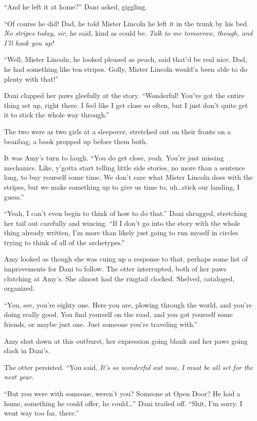 ``And he left it at home?'' Dani asked, giggling.

``Of course he did! Dad, he told Mister Lincoln he left it in the trunk by his bed. \emph{No stripes today, sir,} he said, kind as could be. \emph{Talk to me tomorrow, though, and I'll hook you up!}

``Well, Mister Lincoln, he looked pleased as peach, said that'd be real nice. Dad, he had something like ten stripes. Golly, Mister Lincoln would'a been able to do plenty with that!''

Dani clapped her paws gleefully at the story. ``Wonderful! You've got the entire thing set up, right there. I feel like I get close so often, but I just don't quite get it to stick the whole way through.''

The two were as two girls at a sleepover, stretched out on their fronts on a beanbag, a book propped up before them both.

It was Amy's turn to laugh. ``You do get close, yeah. You're just missing mechanics. Like, y'gotta start telling little side stories, no more than a sentence long, to buy yourself some time. We don't care what Mister Lincoln does with the stripes, but we make something up to give us time to, uh\ldots{}stick our landing, I guess.''

``Yeah, I can't even begin to think of how to do that.'' Dani shrugged, stretching her tail out carefully and wincing. ``If I don't go into the story with the whole thing already written, I'm more than likely just going to run myself in circles trying to think of all of the archetypes.''

Amy looked as though she was cuing up a response to that, perhaps some list of improvements for Dani to follow. The otter interrupted, both of her paws clutching at Amy's. She almost had the ringtail clocked. Shelved, cataloged, organized.

``You, see, you're eighty one. Here you are, plowing through the world, and you're doing really good. You find yourself on the road, and you got yourself some friends, or maybe just one. Just someone you're traveling with.''

Amy shut down at this outburst, her expression going blank and her paws going slack in Dani's.

The otter persisted. ``You said, \emph{It's so wonderful out now, I must be all set for the next year.}

``But you were with someone, weren't you? Someone at Open Door? He had a home, something he could offer, he could\ldots{}'' Dani trailed off. ``Shit, I'm sorry. I went way too far, there.''

